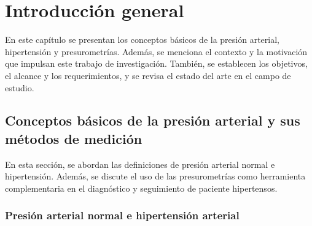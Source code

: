 
\chapter{Introducción general} %

\label{Chapter1} %
\label{IntroGeneral}


\newcommand{\keyword}[1]{\textbf{#1}}
\newcommand{\tabhead}[1]{\textbf{#1}}
\newcommand{\code}[1]{\texttt{#1}}
\newcommand{\file}[1]{\texttt{\bfseries#1}}
\newcommand{\option}[1]{\texttt{\itshape#1}}
\newcommand{\grados}{$^{\circ}$}



En este capítulo se presentan los conceptos básicos de la presión arterial, hipertensión y presurometrías.
Además, se menciona  el contexto y la motivación que impulsan este trabajo de investigación. 
También, se establecen los objetivos, el alcance y los requerimientos, y se revisa el estado del arte 
en el campo de estudio.

\section{Conceptos básicos de la presión arterial y sus métodos de medición}

En esta sección, se abordan las definiciones de presión arterial normal e hipertensión. 
Además, se discute el uso de las presurometrías como herramienta complementaria en el diagnóstico 
y seguimiento de paciente hipertensos.

\subsection{Presión arterial normal e hipertensión arterial}

